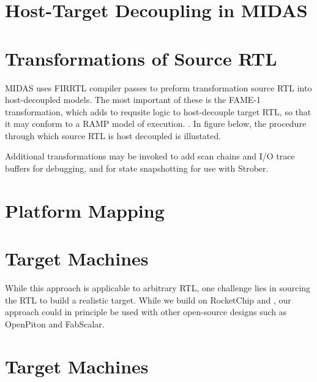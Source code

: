 \section{Host-Target Decoupling in MIDAS}






\section{Transformations of Source RTL}

MIDAS uses FIRRTL compiler passes to preform transformation source RTL into
host-decoupled models. The most important of these is the FAME-1
transformation, which adds to requsite logic to host-decouple target RTL, so
that it may conform to a RAMP model of execution. . In figure
 below, the procedure through which source RTL is
host decoupled is illustated.

Additional transformations may be invoked to add scan chains and I/O trace
buffers for debugging, and for state snapshotting for use with
Strober\cite{strober}.

\section{Platform Mapping}

\section{Target Machines}

While this approach is applicable to arbitrary RTL, one challenge lies in
sourcing the RTL to build a realistic target. While we build on RocketChip and
\RISCV, our approach could in principle be used with other open-source designs
such as OpenPiton\cite{openpiton} and FabScalar\cite{fabscalar}.

\section{Target Machines}
